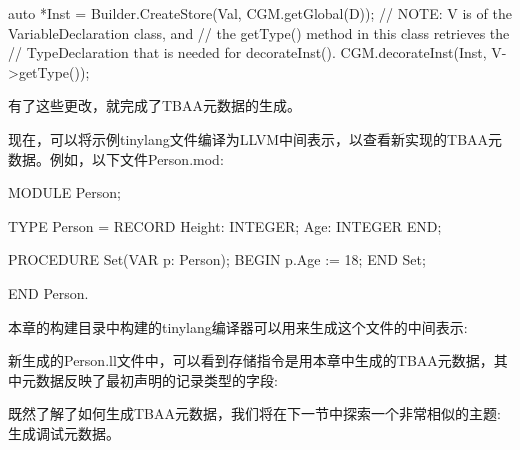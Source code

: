 \begin{cpp}
    auto *Inst = Builder.CreateStore(Val, CGM.getGlobal(D));
    // NOTE: V is of the VariableDeclaration class, and
    // the getType() method in this class retrieves the
    // TypeDeclaration that is needed for decorateInst().
    CGM.decorateInst(Inst, V->getType());
\end{cpp}

有了这些更改，就完成了TBAA元数据的生成。

现在，可以将示例tinylang文件编译为LLVM中间表示，以查看新实现的TBAA元数据。例如，以下文件Person.mod:

\begin{shell}
MODULE Person;

TYPE
    Person = RECORD
                Height: INTEGER;
                Age: INTEGER
             END;

PROCEDURE Set(VAR p: Person);
BEGIN
    p.Age := 18;
END Set;

END Person.
\end{shell}

本章的构建目录中构建的tinylang编译器可以用来生成这个文件的中间表示:


新生成的Person.ll文件中，可以看到存储指令是用本章中生成的TBAA元数据，其中元数据反映了最初声明的记录类型的字段:


既然了解了如何生成TBAA元数据，我们将在下一节中探索一个非常相似的主题:生成调试元数据。

























